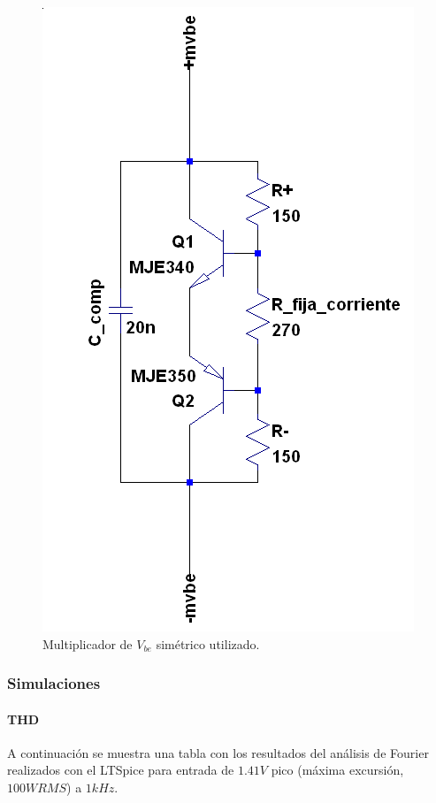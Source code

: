 \documentclass[a4paper,12pt,twoside]{article}
\begin{document}
\begin{figure}[H]
\centering
\includegraphics[height=0.3\textwidth]{img/sim/mvbe}
\caption{Multiplicador de $V_{be}$ simétrico utilizado.}
\label{fig:mvbe} 
\end{figure}




\subsubsection{Simulaciones}


\paragraph{THD} A continuación se muestra una tabla con los resultados del análisis de Fourier realizados con el LTSpice para entrada de $1.41V$ pico (máxima excursión, $100W RMS$) a $1kHz$. 
\end{document}
